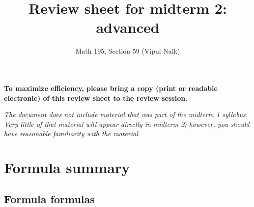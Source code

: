 \documentclass[10pt]{amsart}
\title{Review sheet for midterm 2: advanced}
\author{Math 195, Section 59 (Vipul Naik)}
\begin{document}
\maketitle

{\bf To maximize efficiency, please bring a copy (print or readable
electronic) of this review sheet to the review session.}

{\em The document does not include material that was part of the
midterm 1 syllabus. Very little of that material will appear directly
in midterm 2; however, you should have reasonable familiarity with the
material}.

\section{Formula summary}

\subsection{Formula formulas}
\end{document}
